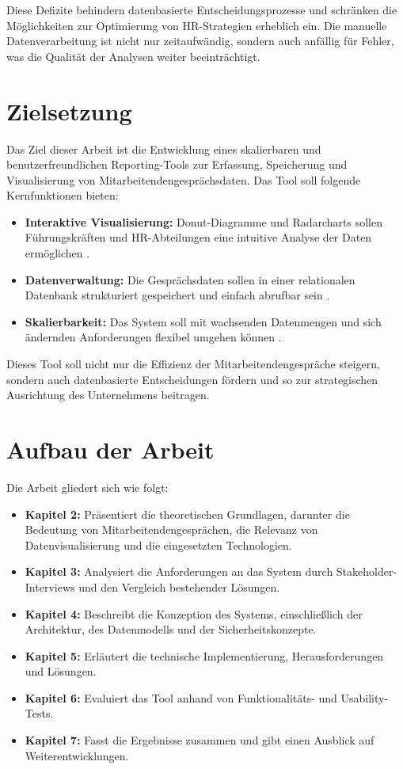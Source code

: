 Diese Defizite behindern datenbasierte Entscheidungsprozesse und schränken die Möglichkeiten zur Optimierung von HR-Strategien erheblich ein. Die manuelle Datenverarbeitung ist nicht nur zeitaufwändig, sondern auch anfällig für Fehler, was die Qualität der Analysen weiter beeinträchtigt.

\section{Zielsetzung}
Das Ziel dieser Arbeit ist die Entwicklung eines skalierbaren und benutzerfreundlichen Reporting-Tools zur Erfassung, Speicherung und Visualisierung von Mitarbeitendengesprächsdaten. Das Tool soll folgende Kernfunktionen bieten:
\begin{itemize}
    \item \textbf{Interaktive Visualisierung:} Donut-Diagramme und Radarcharts sollen Führungskräften und HR-Abteilungen eine intuitive Analyse der Daten ermöglichen \cite{kirk2016data, evergreen2016effective}.
    \item \textbf{Datenverwaltung:} Die Gesprächsdaten sollen in einer relationalen Datenbank strukturiert gespeichert und einfach abrufbar sein \cite{azureDocumentation}.
    \item \textbf{Skalierbarkeit:} Das System soll mit wachsenden Datenmengen und sich ändernden Anforderungen flexibel umgehen können \cite{microsoftAzure}.
\end{itemize}

Dieses Tool soll nicht nur die Effizienz der Mitarbeitendengespräche steigern, sondern auch datenbasierte Entscheidungen fördern und so zur strategischen Ausrichtung des Unternehmens beitragen.

\section{Aufbau der Arbeit}
Die Arbeit gliedert sich wie folgt:
\begin{itemize}
    \item \textbf{Kapitel 2:} Präsentiert die theoretischen Grundlagen, darunter die Bedeutung von Mitarbeitendengesprächen, die Relevanz von Datenvisualisierung und die eingesetzten Technologien.
    \item \textbf{Kapitel 3:} Analysiert die Anforderungen an das System durch Stakeholder-Interviews und den Vergleich bestehender Lösungen.
    \item \textbf{Kapitel 4:} Beschreibt die Konzeption des Systems, einschließlich der Architektur, des Datenmodells und der Sicherheitskonzepte.
    \item \textbf{Kapitel 5:} Erläutert die technische Implementierung, Herausforderungen und Lösungen.
    \item \textbf{Kapitel 6:} Evaluiert das Tool anhand von Funktionalitäts- und Usability-Tests.
    \item \textbf{Kapitel 7:} Fasst die Ergebnisse zusammen und gibt einen Ausblick auf Weiterentwicklungen.
\end{itemize}
